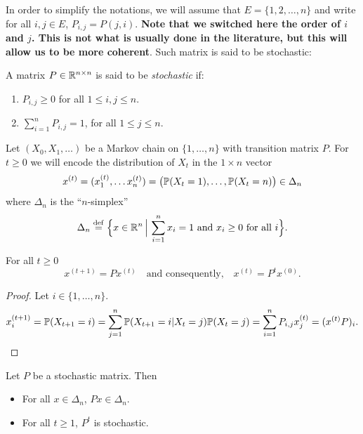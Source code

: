 \documentclass[11pt,nocut]{article}
\begin{document}
In order to simplify the notations, we will assume that $E = \{1,2, \dots, n\}$ and write for all $i,j \in E$, $P_{i,j} = P(j,i)$. 
\textbf{Note that we switched here the order of $i$ and $j$. This is not what is usually done in the literature, but this will allow us to be more coherent}.
Such matrix is said to be stochastic:

\begin{definition}
	A matrix $P \in \R^{n \times n}$ is said to be \emph{stochastic} if:
	\begin{enumerate}[label=(\roman*),noitemsep]
		\item $P_{i,j} \geq 0$ for all $1 \leq i,j \leq n$.
		\item $\sum\limits_{i=1}^n P_{i,j} = 1$, for all $1 \leq j \leq n$.
	\end{enumerate}
\end{definition}

Let $(X_0, X_1, \dots)$ be a Markov chain on $\{1, \dots, n\}$ with transition matrix $P$. For $t \geq 0$ we will encode the distribution of $X_t$ in the $1 \times n$ vector
$$
x^{(t)} = (x^{(t)}_1, \dots x^{(t)}_n) 
= \big(\P(X_t = 1), \dots, \P(X_t = n)\big) \in \Delta_n
$$
where $\Delta_n$ is the ``$n$-simplex''
$$
\Delta_n \defeq \Big\{ x \in \R^n \, \Big| \, \sum_{i=1}^n x_i = 1 \ \text{and} \ x_i \geq 0 \ \text{for all} \ i \Big\}.
$$


\begin{proposition}
	For all $t \geq 0$
	$$
	x^{(t+1)} = P x^{(t)}
	\quad \text{and consequently,} \quad
	x^{(t)} =  P^t x^{(0)}.
	$$
\end{proposition}
\begin{proof} Let $i \in \{1,\dots, n\}$.
	\begin{align*}
		x^{(t+1)}_i
		= \P(X_{t+1}=i)
		= \sum_{j=1}^n \P(X_{t+1}=i|X_t = j) \P(X_t = j)
		= \sum_{i=1}^n P_{i,j} x^{(t)}_j
		= (x^{(t)} P)_i.
	\end{align*}
\end{proof}

\begin{corollary}\label{cor:stab}
	Let $P$ be a stochastic matrix. Then
	\begin{itemize}
		\item For all $x \in \Delta_n$, $Px \in \Delta_n$.
		\item For all $t \geq 1$, $P^t$ is stochastic.
	\end{itemize}
\end{corollary}
\end{document}
